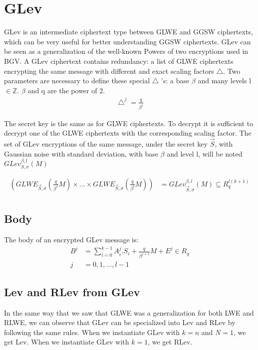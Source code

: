 \documentclass{techrep}
\theoremstyle{definition}
\theoremstyle{plain}
\newcommand{\Z}{\mathbb{Z}}
\begin{document}
\section{GLev }
GLev is an intermediate ciphertext type between GLWE and GGSW ciphertexts, which can be very useful for better understanding GGSW ciphertexts. GLev can be seen as a generalization of the well-known Powers of two encryptions used in BGV. A GLev ciphertext contains redundancy: a list of GLWE ciphertexts encrypting the same message 
 with different and exact scaling factors $\bigtriangleup$. Two parameters are necessary to define these special 
$\bigtriangleup$ ’s: a base $\beta$
and many levels l $\in \Z$.  $\beta$ and q are the power of 2. 
\begin{align*}
 \bigtriangleup^j = \frac{q}{\beta^j}
\end{align*}

The secret key is the same as for GLWE ciphertexts. To decrypt it is sufficient to decrypt one of the GLWE ciphertexts with the corresponding scaling factor. The set of GLev encryptions of the same message, under the secret key $\overrightarrow{S}$, with Gaussian noise with standard deviation, with base $\beta$ and level l, will be noted  ${GLev}_{S, \sigma}^{\beta, l}(M)$


	\begin{align*}
(GLWE_{\overrightarrow{S},\sigma}(\frac{q}{\beta^1} M) \times ... \times GLWE_{\overrightarrow{S},\sigma}(\frac{q}{\beta^l} M))	&=	{GLev}_{\overrightarrow{S}, \sigma}^{\beta, l}(M)  \subseteq  R_{q}^{l{(k+1)}}  \\
	\end{align*}


	\subsection{Body}
The body of an encrypted GLev message is:
	\begin{align*}
		B^j &= \sum_{i=0}^{k-1}A_i^j . S_i + \frac{q}{\beta^{j+1}} M + E^j \in R_q  \\
            j &= 0,1,...,l-1
	\end{align*}


\subsection{Lev and RLev from GLev }
In the same way that we saw that GLWE was a generalization for both LWE and RLWE, we can observe that GLev can be specialized into Lev and RLev by following the same rules. When we instantiate GLev with $k = n$ and $N = 1$, we get Lev.  When we instantiate GLev with $k = 1$, we get RLev.
\end{document}
